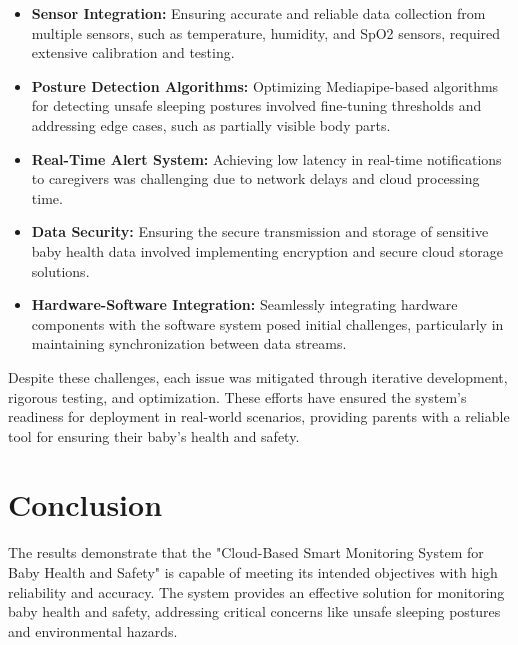 \documentclass[12pt,a4paper]{report}
\begin{document}
\begin{itemize}
    \item \textbf{Sensor Integration:} Ensuring accurate and reliable data collection from multiple sensors, such as temperature, humidity, and SpO2 sensors, required extensive calibration and testing.
    \item \textbf{Posture Detection Algorithms:} Optimizing Mediapipe-based algorithms for detecting unsafe sleeping postures involved fine-tuning thresholds and addressing edge cases, such as partially visible body parts.
    \item \textbf{Real-Time Alert System:} Achieving low latency in real-time notifications to caregivers was challenging due to network delays and cloud processing time.
    \item \textbf{Data Security:} Ensuring the secure transmission and storage of sensitive baby health data involved implementing encryption and secure cloud storage solutions.
    \item \textbf{Hardware-Software Integration:} Seamlessly integrating hardware components with the software system posed initial challenges, particularly in maintaining synchronization between data streams.
\end{itemize}

Despite these challenges, each issue was mitigated through iterative development, rigorous testing, and optimization. These efforts have ensured the system's readiness for deployment in real-world scenarios, providing parents with a reliable tool for ensuring their baby's health and safety.


\section{Conclusion}
The results demonstrate that the "Cloud-Based Smart Monitoring System for Baby Health and Safety" is capable of meeting its intended objectives with high reliability and accuracy. The system provides an effective solution for monitoring baby health and safety, addressing critical concerns like unsafe sleeping postures and environmental hazards.
\end{document}
